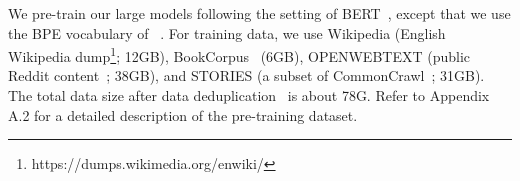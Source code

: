 


We pre-train our large models following the setting of BERT~\citep{devlin2018bert}, except that we use the BPE vocabulary of ~\cite{radford2019language,liu2019roberta}.
For training data, we use Wikipedia (English Wikipedia dump\footnote{https://dumps.wikimedia.org/enwiki/}; 12GB), BookCorpus~\citep{bookcorpus} (6GB), OPENWEBTEXT (public Reddit content~\citep{Gokaslan2019OpenWeb}; 38GB), and STORIES (a subset of CommonCrawl~\citep{trinh2018simple}; 31GB). 
The total data size after data deduplication~\citep{shoeybi2019megatron} is about 78G. 
Refer to Appendix A.2 for a detailed description of the pre-training dataset.

